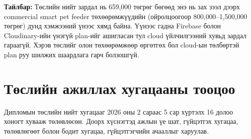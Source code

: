 \documentclass[12pt,a4paper]{report}
\begin{document}
\textbf{Тайлбар:} Төслийн нийт зардал нь 659,000 төгрөг бөгөөд энэ нь зах зээл дээрх commercial smart pet feeder төхөөрөмжүүдийн (ойролцоогоор 800,000--1,500,000 төгрөг) дунд хэмжээний үнээс хямд байна. Үүнээс гадна Firebase болон Cloudinary-ийн үнэгүй plan-ийг ашигласан тул cloud үйлчилгээний хувьд зардал гараагүй. Хэрэв төслийг олон төхөөрөмжөөр өргөтгөх бол cloud-ын төлбөртэй plan руу шилжих шаардлага гарч болзошгүй.

\section{Төслийн ажиллах хугацааны тооцоо}

Дипломын төслийн нийт хугацааг 2026 оны 2 сараас 5 сар хүртэлх 16 долоо хоногт хувааж төлөвлөсөн. Доорх хүснэгтэд ажлын үе шат, гүйцэтгэх хугацаа, төлөвлөгөөт болон бодит хугацаа, гүйцэтгэгчийн ачааллыг харуулав.
\end{document}
